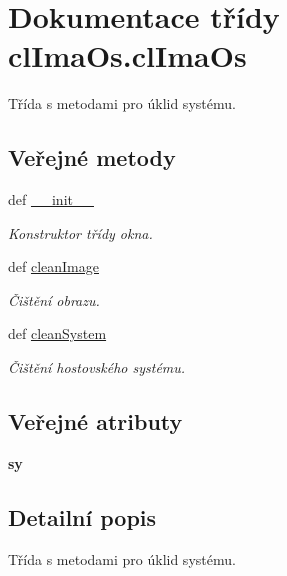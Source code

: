 \hypertarget{classclImaOs_1_1clImaOs}{\section{Dokumentace třídy cl\-Ima\-Os.\-cl\-Ima\-Os}
\label{d5/d13/classclImaOs_1_1clImaOs}
}


Třída s metodami pro úklid systému.  


\subsection*{Veřejné metody}
\begin{DoxyCompactItemize}
\item 
def \hyperlink{classclImaOs_1_1clImaOs_a645fab5aef6d331821b561e69d665fb0}{\-\_\-\-\_\-init\-\_\-\-\_\-}
\begin{DoxyCompactList}\small\item\em Konstruktor třídy okna. \end{DoxyCompactList}\item 
def \hyperlink{classclImaOs_1_1clImaOs_a98998f9ce2a3918b093ebed313e95061}{clean\-Image}
\begin{DoxyCompactList}\small\item\em Čištění obrazu. \end{DoxyCompactList}\item 
def \hyperlink{classclImaOs_1_1clImaOs_adbf1356c7c45a2aeaf9680c50856c18a}{clean\-System}
\begin{DoxyCompactList}\small\item\em Čištění hostovského systému. \end{DoxyCompactList}\end{DoxyCompactItemize}
\subsection*{Veřejné atributy}
\begin{DoxyCompactItemize}
\item 
\hypertarget{classclImaOs_1_1clImaOs_a269176bf9e06df5c8ed6a4d322cb2268}{{\bfseries sy}}\label{d5/d13/classclImaOs_1_1clImaOs_a269176bf9e06df5c8ed6a4d322cb2268}

\end{DoxyCompactItemize}


\subsection{Detailní popis}
Třída s metodami pro úklid systému. 

